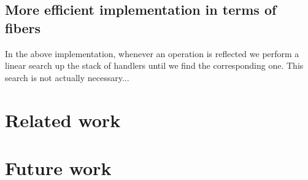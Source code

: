 \documentclass[acmsmall, screen, nonacm]{acmart}
\begin{document}
\subsection{More efficient implementation in terms of fibers}

In the above implementation, whenever an operation is reflected we
perform a linear search up the stack of handlers until we find the
corresponding one. This search is not actually necessary...

\section{Related work}
\label{sec:related-work}

\section{Future work}
\label{sec:future-work}



\end{document}
